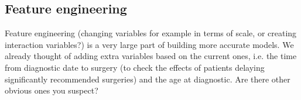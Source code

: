 \documentclass[a4paper]{article}
\begin{document}
\subsection{Feature engineering}
Feature engineering (changing variables for example in terms of scale, or creating interaction variables?) is a very large part of building more accurate models. We already thought of adding extra variables based on the current ones, i.e. the time from diagnostic date to surgery (to check the effects of patients delaying significantly recommended surgeries) and the age at diagnostic. Are there other obvious ones you suspect? 



\end{document}

